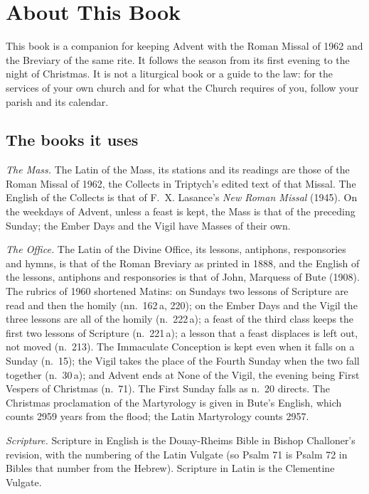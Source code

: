 \section{About This Book}\label{sec:scope}

This book is a companion for keeping Advent with the Roman Missal of 1962 and
the Breviary of the same rite. It follows the season from its first evening to
the night of Christmas. It is not a liturgical book or a guide to the law: for
the services of your own church and for what the Church requires of you, follow
your parish and its calendar.

\subsection{The books it uses}

\textit{The Mass.} The Latin of the Mass, its stations and its readings are
those of the Roman Missal of 1962, the Collects in Triptych's edited text of
that Missal. The English of the Collects is that of
F.~X. Lasance's \textit{New Roman Missal} (1945). On the weekdays of Advent,
unless a feast is kept, the Mass is that of the preceding Sunday; the Ember
Days and the Vigil have Masses of their own.

\textit{The Office.} The Latin of the Divine Office, its lessons, antiphons,
responsories and hymns, is that of the Roman Breviary as printed in 1888, and
the English of the lessons, antiphons and responsories is that of John,
Marquess of Bute (1908). The rubrics of 1960 shortened Matins: on Sundays two
lessons of Scripture are read and then the homily (nn.~162\,a, 220); on the
Ember Days and the Vigil the three lessons are all of the homily (n.~222\,a); a
feast of the third class keeps the first two lessons of Scripture (n.~221\,a);
a lesson that a feast displaces is left out, not moved (n.~213). The Immaculate
Conception is kept even when it falls on a Sunday (n.~15); the Vigil takes the
place of the Fourth Sunday when the two fall together (n.~30\,a); and Advent
ends at None of the Vigil, the evening being First Vespers of Christmas
(n.~71). The First Sunday falls as n.~20 directs. The Christmas proclamation of
the Martyrology is given in Bute's English, which counts 2959 years from the
flood; the Latin Martyrology counts 2957.

\textit{Scripture.} Scripture in English is the Douay-Rheims Bible in Bishop
Challoner's revision, with the numbering of the Latin Vulgate (so Psalm 71 is
Psalm 72 in Bibles that number from the Hebrew). Scripture in Latin is the
Clementine Vulgate.

